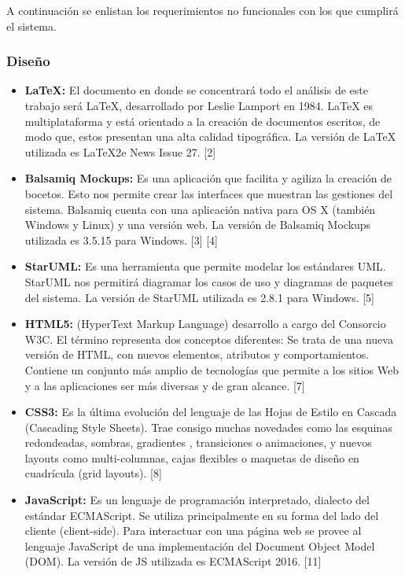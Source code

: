 	A continuación se enlistan los requerimientos no funcionales con los que cumplirá el sistema.
	
	\subsubsection{Diseño}
	
	\begin{itemize}
		\item \textbf{LaTeX:} El documento en donde se concentrará todo el análisis de este trabajo será LaTeX, desarrollado por Leslie Lamport en 1984. LaTeX es multiplataforma y está orientado a la creación de documentos escritos, de modo que, estos  presentan una alta calidad tipográfica. La versión de LaTeX utilizada es LaTeX2e News Issue 27. [2]
		
		\item \textbf{Balsamiq Mockups:} Es una aplicación que facilita y agiliza la creación de bocetos. Esto nos permite crear las interfaces que muestran las gestiones del sistema. Balsamiq cuenta con una aplicación nativa para OS X (también Windows y Linux) y una versión web. La versión de Balsamiq Mockups utilizada es 3.5.15 para Windows. [3] [4]
		
		\item \textbf{StarUML:} Es una herramienta que permite modelar los estándares UML. StarUML nos permitirá diagramar los casos de uso y diagramas de paquetes del sistema. La versión de StarUML utilizada es 2.8.1 para Windows. [5]
		
		\item \textbf{HTML5:} (HyperText Markup Language) desarrollo a cargo del Consorcio W3C. El término representa dos conceptos diferentes: Se trata de una nueva versión de HTML, con nuevos elementos, atributos y comportamientos. Contiene un conjunto más amplio de tecnologías que permite a los sitios Web y a las aplicaciones ser más diversas y de gran alcance. [7]
		
		\item \textbf{CSS3:} Es la última evolución del lenguaje de las Hojas de Estilo en Cascada (Cascading Style Sheets). Trae consigo muchas novedades como las esquinas redondeadas, sombras, gradientes , transiciones o animaciones, y nuevos layouts como multi-columnas, cajas flexibles o maquetas de diseño en cuadrícula (grid layouts). [8]
		
		\item \textbf{JavaScript:} Es un lenguaje de programación interpretado, dialecto del estándar ECMAScript. Se utiliza principalmente en su forma del lado del cliente (client-side). Para interactuar con una página web se provee al lenguaje JavaScript de una implementación del Document Object Model (DOM). La versión de JS utilizada es ECMAScript 2016. [11]
				

\end{itemize}

